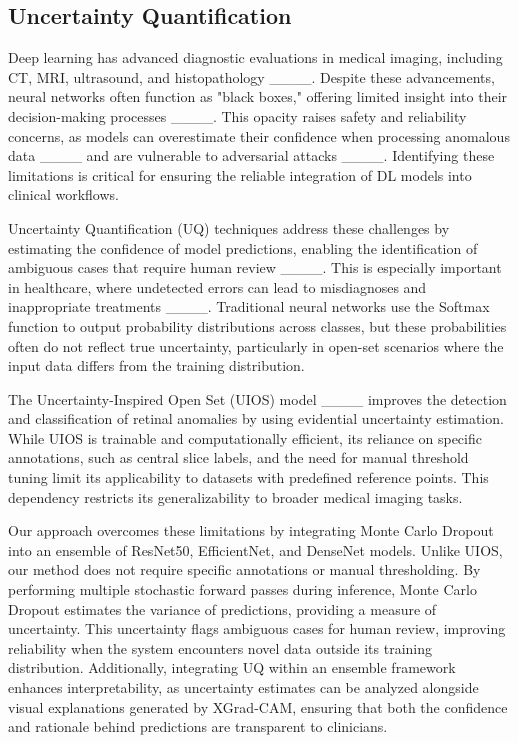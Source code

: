 \subsection{Uncertainty Quantification}

Deep learning has advanced diagnostic evaluations in medical imaging, including CT, MRI, ultrasound, and histopathology ____. Despite these advancements, neural networks often function as "black boxes," offering limited insight into their decision-making processes ____. This opacity raises safety and reliability concerns, as models can overestimate their confidence when processing anomalous data ____ and are vulnerable to adversarial attacks ____. Identifying these limitations is critical for ensuring the reliable integration of DL models into clinical workflows.

Uncertainty Quantification (UQ) techniques address these challenges by estimating the confidence of model predictions, enabling the identification of ambiguous cases that require human review ____. This is especially important in healthcare, where undetected errors can lead to misdiagnoses and inappropriate treatments ____. Traditional neural networks use the Softmax function to output probability distributions across classes, but these probabilities often do not reflect true uncertainty, particularly in open-set scenarios where the input data differs from the training distribution.

The Uncertainty-Inspired Open Set (UIOS) model ____ improves the detection and classification of retinal anomalies by using evidential uncertainty estimation. While UIOS is trainable and computationally efficient, its reliance on specific annotations, such as central slice labels, and the need for manual threshold tuning limit its applicability to datasets with predefined reference points. This dependency restricts its generalizability to broader medical imaging tasks.

Our approach overcomes these limitations by integrating Monte Carlo Dropout into an ensemble of ResNet50, EfficientNet, and DenseNet models. Unlike UIOS, our method does not require specific annotations or manual thresholding. By performing multiple stochastic forward passes during inference, Monte Carlo Dropout estimates the variance of predictions, providing a measure of uncertainty. This uncertainty flags ambiguous cases for human review, improving reliability when the system encounters novel data outside its training distribution. Additionally, integrating UQ within an ensemble framework enhances interpretability, as uncertainty estimates can be analyzed alongside visual explanations generated by XGrad-CAM, ensuring that both the confidence and rationale behind predictions are transparent to clinicians.

